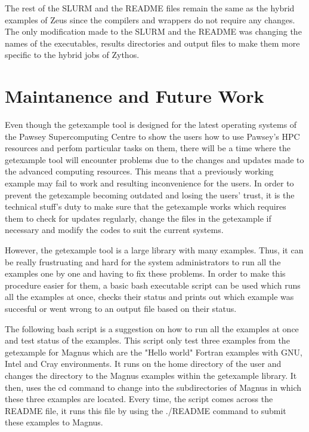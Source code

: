 \documentclass[journal]{IEEEtran}
\begin{document}
The rest of the SLURM and the README files remain the same as the hybrid examples of Zeus since the compilers and wrappers do not require any changes.
The only modification made to the SLURM and the README was changing the names of the executables, results directories and output files to make them more
specific to the hybrid jobs of Zythos. 

  
\section{Maintanence and Future Work}

Even though the getexample tool is designed for the latest operating systems of the Pawsey Supercomputing Centre to show the users how to use
Pawsey's HPC resources and perfom particular tasks on them, there will be a time where the getexample tool will encounter problems due 
to the changes and updates made to the advanced computing resources. This means that a previously working example may fail to work and resulting 
inconvenience for the users. In order to prevent the getexample becoming outdated and losing the users' trust, it is the technical stuff's 
duty to make sure that the getexample works which requires them to check for updates regularly, change the files in the getexample if necessary and 
modify the codes to suit the current systems.

However, the getexample tool is a large library with many examples. Thus, it can be really frustruating and hard for the system administrators to run 
all the examples one by one and having to fix these problems. In order to make this procedure easier for them, a basic bash executable script can be 
used which runs all the examples at once, checks their status and prints out which example was succesful or went wrong to an output file based on their
status.

The following bash script is a suggestion on how to run all the examples at once and test status of the examples. This script only test three examples
from the getexample for Magnus which are the "Hello world" Fortran examples with GNU, Intel and Cray environments. It runs on the home directory of the
user and changes the directory to the Magnus examples within the getexample library. It then, uses the cd command to change into the subdirectories of 
Magnus in which these three examples are located. Every time, the script comes across the README file, it runs this file by using the ./README command
to submit these examples to Magnus.
\end{document}
